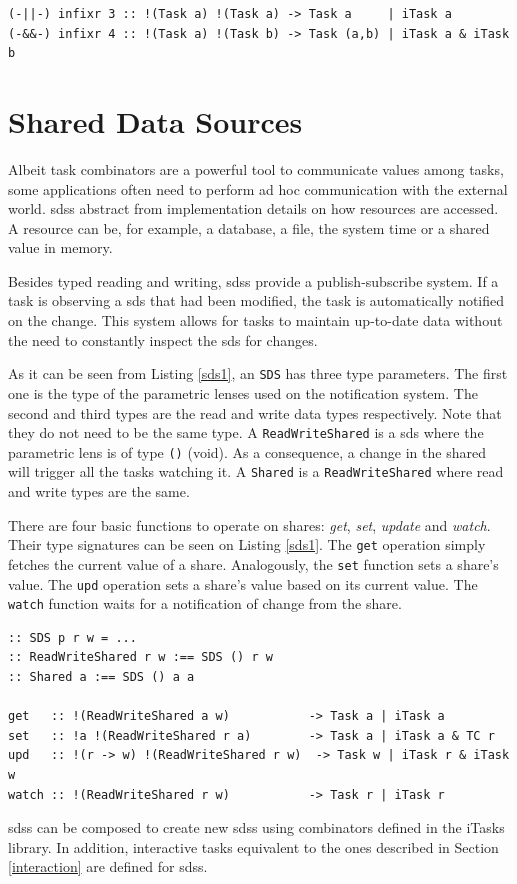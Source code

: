 \begin{lstlisting}[caption=Parallel Combinators,label=par_comb,captionpos=b]
(-||-) infixr 3 :: !(Task a) !(Task a) -> Task a     | iTask a
(-&&-) infixr 4 :: !(Task a) !(Task b) -> Task (a,b) | iTask a & iTask b
\end{lstlisting}


\section{Shared Data Sources}

Albeit task combinators are a powerful tool to 
communicate values among tasks, some applications often need to perform ad hoc communication with the external world. \acp{sds} abstract from implementation details on how resources are accessed. A resource can be, for example, a database, a file, the system time or a shared value in memory. 

Besides typed reading and writing, \acp{sds} provide a publish-subscribe system. If a task is observing a \ac{sds} that had been modified, the task is automatically notified on the change. This system allows for tasks to maintain up-to-date data without the need to constantly inspect the \ac{sds} for changes.

As it can be seen from Listing \ref{sds1}, an \texttt{SDS} has three type parameters. The first one is the type of the parametric lenses used on the notification system\cite{parametric}. The second and third types are the read and write data types respectively. Note that they do not need to be the same type. A \texttt{ReadWriteShared} is a \ac{sds} where the parametric lens is of type \texttt{()} (void). As a consequence, a change in the shared will trigger all the tasks watching it. A \texttt{Shared} is a \texttt{ReadWriteShared} where read and write types are the same.

There are four basic functions to operate on shares: \textit{get}, \textit{set}, \textit{update} and \textit{watch}. Their type signatures can be seen on Listing \ref{sds1}. The \texttt{get} operation simply fetches the current value of a share. Analogously, the \texttt{set} function sets a share's value. The \texttt{upd} operation sets a share's value based on its current value. The \texttt{watch} function waits for a notification of change from the share.

\begin{lstlisting}[caption=Shared Data Sources definitions,label=sds1,captionpos=b]
:: SDS p r w = ...
:: ReadWriteShared r w :== SDS () r w
:: Shared a :== SDS () a a

get   :: !(ReadWriteShared a w)           -> Task a | iTask a
set   :: !a !(ReadWriteShared r a)        -> Task a | iTask a & TC r
upd   :: !(r -> w) !(ReadWriteShared r w)  -> Task w | iTask r & iTask w
watch :: !(ReadWriteShared r w)           -> Task r | iTask r
\end{lstlisting}

\acp{sds} can be composed to create new \acp{sds} using combinators defined in the iTasks library. In addition, interactive tasks equivalent to the ones described in Section \ref{interaction} are defined for \acp{sds}. 